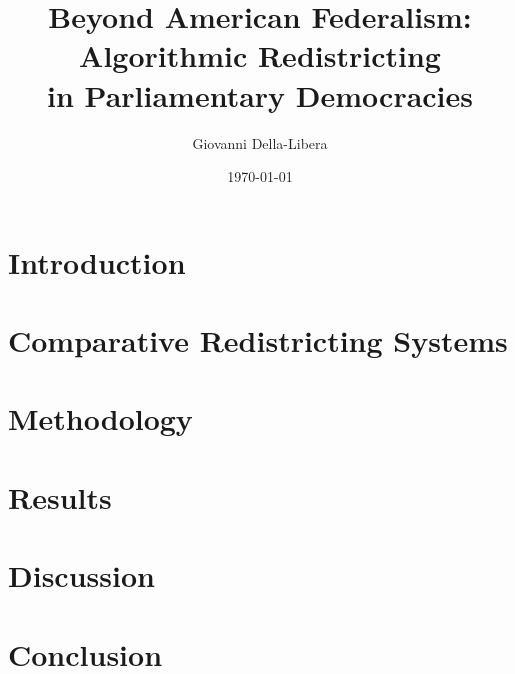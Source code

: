 \documentclass[12pt]{article}
\title{Beyond American Federalism: Algorithmic Redistricting \\
       in Parliamentary Democracies}
\author{Giovanni Della-Libera}
\date{\today}
\begin{document}
\maketitle

\begin{abstract}

\end{abstract}

\section{Introduction}


\section{Comparative Redistricting Systems}


\section{Methodology}


\section{Results}


\section{Discussion}


\section{Conclusion}




\end{document}
